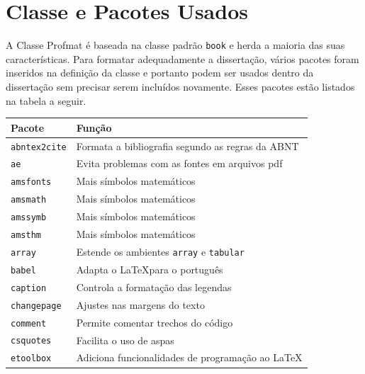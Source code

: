 \documentclass[fleqn]{icat-ufal}
\begin{document}
\section{Classe e Pacotes Usados}
\label{sec:classe_e_pacotes_usados}

A Classe Profmat é baseada na classe padrão \lstinline!book! e herda a maioria 
das suas características. Para formatar adequadamente a dissertação, vários 
pacotes foram inseridos na definição da classe e portanto podem ser usados
dentro da dissertação sem precisar serem incluídos novamente. 
Esses pacotes estão listados na tabela a seguir.

\begin{center}
    \begin{longtable}{ll}
        \hline
        Pacote                  & Função                                                       \\ \hline
        \lstinline!abntex2cite! & Formata a bibliografia segundo as regras da ABNT             \\
        \lstinline!ae!          & Evita problemas com as fontes em arquivos \textsf{pdf}       \\
        \lstinline!amsfonts!    & Mais símbolos matemáticos                                    \\
        \lstinline!amsmath!     & Mais símbolos matemáticos                                    \\
        \lstinline!amssymb!     & Mais símbolos matemáticos                                    \\
        \lstinline!amsthm!      & Mais símbolos matemáticos                                    \\
        \lstinline!array!       & Estende os ambientes \lstinline!array! e \lstinline!tabular! \\
        \lstinline!babel!       & Adapta o \LaTeX para o português                             \\
        \lstinline!caption!     & Controla a formatação das legendas                           \\
        \lstinline!changepage!  & Ajustes nas margens do texto                                 \\
        \lstinline!comment!     & Permite comentar trechos do código                           \\
        \lstinline!csquotes!    & Facilita o uso de aspas                                      \\
        \lstinline!etoolbox!    & Adiciona funcionalidades de programação ao \LaTeX            \\

\end{longtable}
\end{center}
\end{document}
